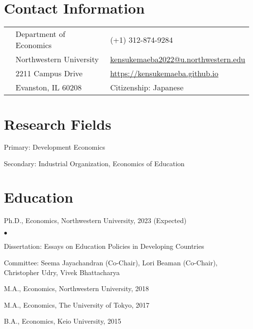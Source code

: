 \documentclass[margin,line]{res}
\newenvironment{list1}{
  \begin{list}{\ding{113}}{%
      \setlength{\itemsep}{.025in}
      \setlength{\parsep}{0in} \setlength{\parskip}{0in}
      \setlength{\topsep}{0in} \setlength{\partopsep}{0in}
      \setlength{\leftmargin}{0.17in}}}{\end{list}}
\newenvironment{list2}{
  \begin{list}{$\bullet$}{%
      \setlength{\itemsep}{0in}
      \setlength{\parsep}{0in} \setlength{\parskip}{0in}
      \setlength{\topsep}{0in} \setlength{\partopsep}{0in}
      \setlength{\leftmargin}{0.2in}}}{\end{list}}
\begin{document}

~\\
~\\

\begin{resume}
\thispagestyle{plain} %

\section{Contact Information}
\vspace{.05in}
\begin{tabular}{@{}p{0.20in}p{2.75in}p{2.75in}}
 & Department of Economics           & (+1) 312-874-9284 \\
 & Northwestern University   &  \href{mailto: kensukemaeba2022@u.northwestern.edu}{kensukemaeba2022@u.northwestern.edu} \\
 & 2211 Campus Drive &  \href{https://kensukemaeba.github.io}{https://kensukemaeba.github.io}\\
 & Evanston, IL 60208  & Citizenship: Japanese
\end{tabular}

\section{Research Fields}
\begin{list1}
\item[] Primary: Development Economics
\item[] Secondary: Industrial Organization, Economics of Education
\vspace*{.05in}
\end{list1}

\section{ Education}\begin{tiny}

\end{tiny}
\begin{list1}
\item[] Ph.D., Economics, Northwestern University, 2023 (Expected)
	\begin{list2}
		\item[] Dissertation: Essays on Education Policies in Developing Countries
		\item[] Committee: Seema Jayachandran (Co-Chair), Lori Beaman (Co-Chair), Christopher Udry, Vivek Bhattacharya
	\end{list2}
\item[] M.A., Economics, Northwestern University, 2018
\item[] M.A., Economics, The University of Tokyo, 2017
\item[] B.A., Economics, Keio University, 2015
\end{list1}


\end{resume}
\end{document}
